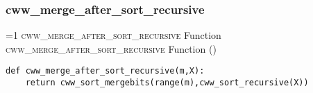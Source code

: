         \subsubsection{cww\_merge\_after\_sort\_recursive}
\setcounter{cwwmergeaftersortrecursivefunctioncounter}{1}
\newcommand{\cwwmergeaftersortrecursivefunctionframe}{%
    \ifnum\value{cwwmergeaftersortrecursivefunctioncounter}=1
        \textsc{cww\_merge\_after\_sort\_recursive} Function%
    \else
        \textsc{cww\_merge\_after\_sort\_recursive} Function (\thecwwmergeaftersortrecursivefunctioncounter)%
    \fi
}
            \begin{frame}[containsverbatim]{\cwwmergeaftersortrecursivefunctionframe}
                \begin{verbatim}
def cww_merge_after_sort_recursive(m,X):
    return cww_sort_mergebits(range(m),cww_sort_recursive(X))
                    \end{verbatim}
            \end{frame}

